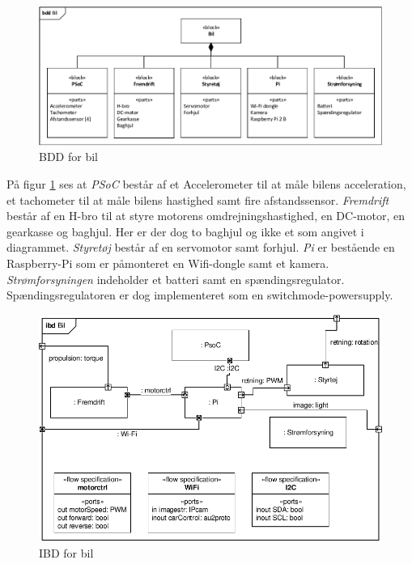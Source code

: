 \begin{landscape}

\begin{figure}
\centering
\includegraphics[width=\linewidth]{../fig/diagrammer/bil/bdd_bil.pdf}
\caption{BDD for bil}
\label{fig:bdd_bil}
\end{figure}
\end{landscape}

\clearpage

På figur \ref{fig:bdd_bil} ses at \emph{PSoC} består af et Accelerometer til at måle bilens acceleration, et tachometer til at måle bilens hastighed samt fire afstandssensor. 
\emph{Fremdrift} består af en H-bro til at styre motorens omdrejningshastighed, en DC-motor, en gearkasse og baghjul. 
Her er der dog to baghjul og ikke et som angivet i diagrammet. 
\emph{Styretøj} består af en servomotor samt forhjul. 
\emph{Pi} er bestående en  Raspberry-Pi som er påmonteret en Wifi-dongle samt et kamera. 
\emph{Strømforsyningen} indeholder et batteri samt en spændingsregulator. Spændingsregulatoren er dog implementeret som en switchmode-powersupply.  

\begin{figure}[H]
\centering
\includegraphics[width=\textwidth]{../fig/diagrammer/bil/ibd_bil.pdf}
\caption{IBD for bil}
\label{fig:ibd_bil}
\end{figure} 

